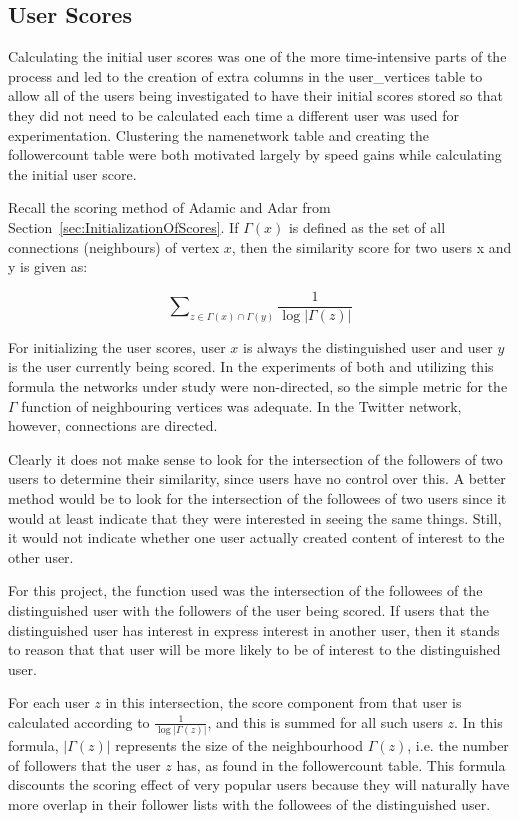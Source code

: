 \subsection{User Scores}

Calculating the initial user scores was one of the more time-intensive parts of the process and led to the creation of extra columns in the user\_vertices table to allow all of the users being investigated to have their initial scores stored so that they did not need to be calculated each time a different user was used for experimentation. Clustering the namenetwork table and creating the followercount table were both motivated largely by speed gains while calculating the initial user score.

Recall the scoring method of Adamic and Adar from Section~\ref{sec:InitializationOfScores}. If $\Gamma (x)$ is defined as the set of all connections (neighbours) of vertex $x$, then the similarity score for two users x and y is given as: 

\begin{center}
\[
\sum\nolimits_{z \in \Gamma (x) \cap \Gamma (y)} \frac{1}{\log |\Gamma (z) |}
\]
\end{center}

For initializing the user scores, user $x$ is always the distinguished user and user $y$ is the user currently being scored. In the experiments of both \cite{Adamic2003} and \cite{LibenNowell2007} utilizing this formula the networks under study were non-directed, so the simple metric for the $\Gamma$ function of neighbouring vertices was adequate. In the Twitter network, however, connections are directed.

Clearly it does not make sense to look for the intersection of the followers of two users to determine their similarity, since users have no control over this. A better method would be to look for the intersection of the followees of two users since it would at least indicate that they were interested in seeing the same things. Still, it would not indicate whether one user actually created content of interest to the other user.

For this project, the function used was the intersection of the followees of the distinguished user with the followers of the user being scored. If users that the distinguished user has interest in express interest in another user, then it stands to reason that that user will be more likely to be of interest to the distinguished user.

For each user $z$ in this intersection, the score component from that user is calculated according to $\frac{1}{\log |\Gamma (z) |}$, and this is summed for all such users $z$. In this formula, $|\Gamma (z)|$ represents the size of the neighbourhood $\Gamma (z)$, i.e. the number of followers that the user $z$ has, as found in the followercount table. This formula discounts the scoring effect of very popular users because they will naturally have more overlap in their follower lists with the followees of the distinguished user.

